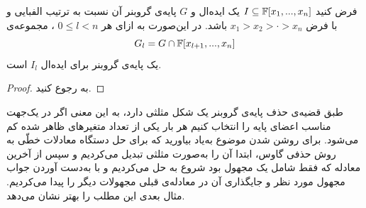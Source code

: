 \begin{theorem}
	\label{elimination th}	
	فرض کنید 
	$I\subseteq\mathbb{F}[x_{1},...,x_{n}]$
	یک ایده‌ال و 
	$G$
	پایه‌ی گروبنر آن نسبت به ترتیب الفبایی و با فرض 
	$x_{1}> x_{2}>\cdot>x_{n}$
	باشد. در این‌صورت به ازای هر 
	$0\leq l < n$
	، مجموعه‌ی 
	$$G_{l} = G\cap \mathbb{F}[x_{l+1},...,x_{n}]$$
	یک پایه‌ی گروبنر برای ایده‌ال 
	$I_{l}$
	است.
\end{theorem}
\begin{proof}
	به 
	\cite[ص.۱۲۳]{IVAcox}
	رجوع کنید.
\end{proof}

\begin{corollary}
	طبق قضیه‌ی حذف پایه‌ی گروبنر یک شکل مثلثی دارد، به این معنی اگر در یک‌جهت مناسب اعضای پایه را انتخاب کنیم هر بار یکی از تعداد متغیرهای ظاهر شده کم می‌شود. برای روشن شدن موضوع به‌یاد بیاورید که برای حل دستگاه معادلات خطّی به روش حذفی گاوس، ابتدا آن را به‌صورت مثلثی تبدیل می‌کردیم و سپس از آخرین معادله که فقط شامل یک مجهول بود شروع به حل می‌کردیم و با به‌دست  آوردن جواب مجهول مورد نظر و جایگذاری آن در معادله‌ی قبلی مجهولات دیگر را پیدا می‌کردیم. مثال بعدی این مطلب را بهتر نشان می‌دهد.
\end{corollary}

